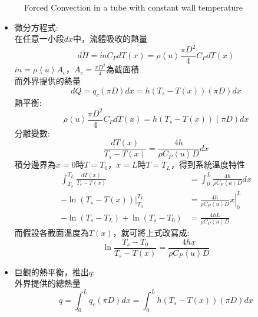 \documentclass[../main.tex]{subfiles}
\begin{document}
\begin{itemize}
\begin{figure}[H]
\begin{tikzpicture}[>=Latex, line cap=round, line join=round, thick]
    \end{tikzpicture}
    \caption{Forced Convection in a tube with constant wall temperature}
    \label{fig:forced_convection_tube_constant_wall_temperature}
  \end{figure}
  \begin{itemize}
    \item 微分方程式:\\
      在任意一小段$dx$中，流體吸收的熱量
      \begin{equation}
        d\dot H = \dot m C_P dT(x) = \rho \left<u\right> \frac{\pi D^2}{4} C_P dT(x)
      \end{equation}
       $\dot  m = \rho \left<u\right> A_c$，$A_c = \frac{\pi D^2}{4}$為截面積\\
      而外界提供的熱量
      \begin{equation}
        dQ = q_c (\pi D) dx = h (T_s - T(x)) (\pi D) dx
      \end{equation}
      熱平衡:
      \begin{equation}
        \rho \left<u\right> \frac{\pi D^2}{4} C_P dT(x) = h (T_s - T(x)) (\pi D) dx
      \end{equation}
      分離變數:
      \begin{equation}
        \frac{dT(x)}{T_s - T(x)} = \frac{4h}{\rho C_P \left<u\right> D} dx
      \end{equation}
      積分邊界為$x=0$時$T=T_0$，$x=L$時$T=T_L$，得到系統溫度特性
      \begin{align}
        \int_{T_0}^{T_L} \frac{dT(x)}{T_s - T(x)} &= \int_0^L \frac{4h}{\rho C_P \left<u\right> D} dx \\
        \left. -\ln\left(T_s - T(x)\right) \right|_{T_0}^{T_L} &= \left. \frac{4h}{\rho C_P \left<u\right> D} x \right|_0^L \\
        -\ln\left(T_s - T_L\right) + \ln\left(T_s - T_0\right) &= \frac{4hL}{\rho C_P \left<u\right> D} 
      \end{align}
      而假設各截面溫度為$T(x)$，就可將上式改寫成:
      \begin{equation}
        \boxed{\ln \frac{T_s - T_0}{T_s - T(x)} = \frac{4h x}{\rho C_P \left<u\right> D}} \label{eq:temperature_distribution_derivation}
      \end{equation}
    \item 巨觀的熱平衡，推出$q$:\\
      外界提供的總熱量
      \begin{equation}
        q = \int_0^L q_c (\pi D)dx = \int_0^L h(T_s -T(x)) (\pi D) dx

\end{equation}
\end{itemize}
\end{itemize}
\end{document}
